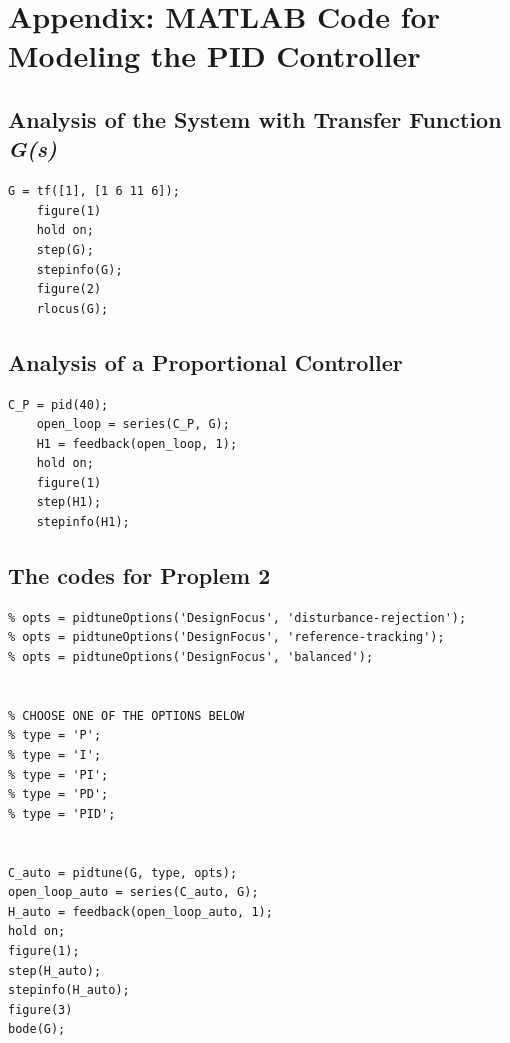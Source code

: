 \documentclass[a4paper, twocolumn, titlepage, 10pt]{article}
\begin{document}
	\section{Appendix: MATLAB Code for Modeling the PID Controller}
		\subsection{Analysis of the System with Transfer Function \textit{G(s)}}
			\begin{lstlisting}[frame=single]
	G = tf([1], [1 6 11 6]);
	figure(1)
	hold on;
	step(G);
	stepinfo(G);
	figure(2)
	rlocus(G);
			\end{lstlisting}
		\subsection{Analysis of a Proportional Controller}
			\begin{lstlisting}[frame=single]
	C_P = pid(40);
	open_loop = series(C_P, G);
	H1 = feedback(open_loop, 1);
	hold on;
	figure(1)
	step(H1);
	stepinfo(H1);
			\end{lstlisting}
		\subsection{The codes for Proplem 2}
			\begin{lstlisting}[frame=single]
% CHOOSE ONE OF THE OPTIONS BELOW
% opts = pidtuneOptions('DesignFocus', 'disturbance-rejection');
% opts = pidtuneOptions('DesignFocus', 'reference-tracking');
% opts = pidtuneOptions('DesignFocus', 'balanced');


% CHOOSE ONE OF THE OPTIONS BELOW
% type = 'P';
% type = 'I';
% type = 'PI';
% type = 'PD';
% type = 'PID';


C_auto = pidtune(G, type, opts);
open_loop_auto = series(C_auto, G);
H_auto = feedback(open_loop_auto, 1);
hold on;
figure(1);
step(H_auto);
stepinfo(H_auto);
figure(3)
bode(G);
	    	\end{lstlisting}	
\end{document}
